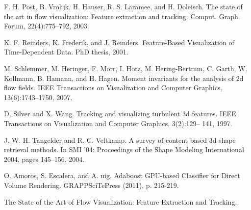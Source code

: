 \documentclass[10pt, conference, compsocconf]{IEEEtran}
\begin{document}
\begin{thebibliography}{1}
\bibitem{}
F. H. Post, B. Vrolijk, H. Hauser, R. S. Laramee, and H. Doleisch. The state of the art in flow visualization: Feature extraction and tracking. Comput. Graph. Forum, 22(4):775–792, 2003.

\bibitem{}
K. F. Reinders, K. Frederik, and J. Reinders. Feature-Based Visualization of Time-Dependent Data. PhD thesis, 2001.

\bibitem{}
M. Schlemmer, M. Heringer, F. Morr, I. Hotz, M. Hering-Bertram, C. Garth, W. Kollmann, B. Hamann, and H. Hagen. Moment invariants for the analysis of 2d flow fields. IEEE Transactions on Visualization and Computer Graphics, 13(6):1743–1750, 2007.

\bibitem{}
D. Silver and X. Wang. Tracking and visualizing turbulent 3d features. IEEE Transactions on Visualization and Computer Graphics, 3(2):129– 141, 1997.

\bibitem{}
J. W. H. Tangelder and R. C. Veltkamp. A survey of content based 3d shape retrieval methods. In SMI ’04: Proceedings of the Shape Modeling International 2004, pages 145–156, 2004.

\bibitem{}
O. Amoros, S. Escalera, and A. uig. Adaboost GPU-based Classifier for Direct Volume Rendering. GRAPPSciTePress (2011), p. 215-219.

\bibitem{}
The State of the Art of Flow Visualization: Feature Extraction and Tracking.

\end{thebibliography}

\end{document}

